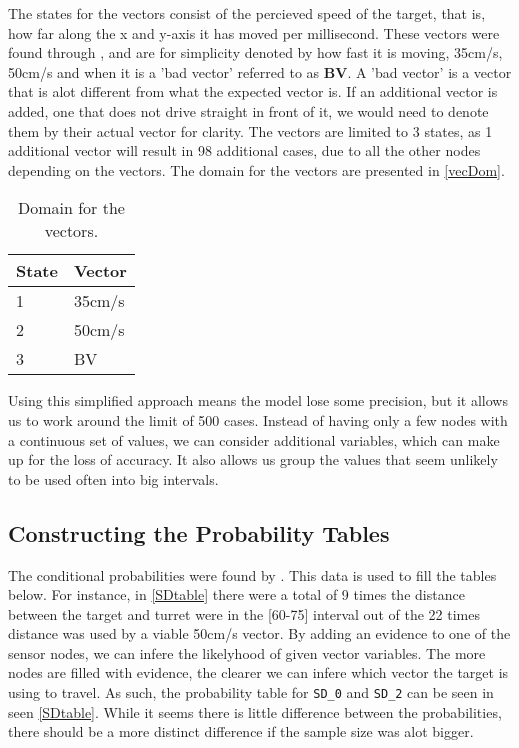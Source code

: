 The states for the vectors consist of the percieved speed of the target, that
is, how far along the x and y-axis it has moved per millisecond. These vectors
were found through , and are for simplicity denoted
by how fast it is moving, 35cm/s, 50cm/s and when it is a 'bad vector' referred
to as \textbf{BV}. A 'bad vector' is a vector that is alot different from what
the expected vector is. If an additional vector is added, one that
does not drive straight in front of it, we would need to denote them by their
actual vector for clarity. The vectors are limited to 3 states, as 1 additional
vector will result in 98 additional cases, due to all the other
nodes depending on the vectors. The domain for the vectors are presented in
\autoref{vecDom}.

\begin{table}[H]
\centering
\begin{tabular}{l|l}
State & Vector \\ \hline
1     & 35cm/s \\
2     & 50cm/s \\
3     & BV
\end{tabular}
\caption{Domain for the vectors.}
\label{vecDom}
\end{table}

Using this simplified approach means the model lose some precision, but it
allows us to work around the limit of 500 cases. Instead of having only a few
nodes with a continuous set of values, we can consider additional variables,
which can make up for the loss of accuracy. It also allows us group the values
that seem unlikely to be used often into big intervals.

\subsection{Constructing the Probability Tables}


The conditional probabilities were found by .
This data is used to fill the tables below. For instance, in \autoref{SDtable}
there were a total of 9 times the distance between the target and turret were in
the [60-75] interval out of the 22 times distance was used by a viable
50cm/s vector. By adding an evidence to one of the sensor nodes, we can infere
the likelyhood of given vector variables. The more nodes are filled with
evidence, the clearer we can infere which vector the target is using to
travel. As such, the probability table for \texttt{SD\_0} and \texttt{SD\_2} can
be seen in seen \autoref{SDtable}. While it seems there is little difference
between the probabilities, there should be a more distinct difference if the
sample size was alot bigger.

